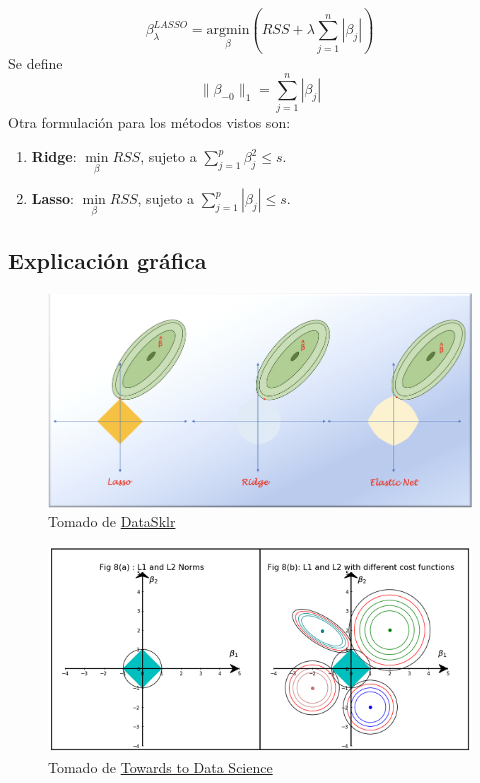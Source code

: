 \documentclass[
  12pt,
]{book}
\providecommand{\tightlist}{%
  \setlength{\itemsep}{0pt}\setlength{\parskip}{0pt}}
\theoremstyle{definition}
\theoremstyle{definition}
\theoremstyle{definition}
\theoremstyle{remark}
\begin{document}
\[ \beta_{\lambda}^{LASSO} = \underset{\beta}{\mathrm{argmin}}\left(RSS + \lambda\sum_{j=1}^n |\beta_j|\right)\]
Se define
\[ \|\beta_{-0}\|_1 = \sum_{j=1}^n|\beta_j|\]
Otra formulación para los métodos vistos son:

\begin{enumerate}
\def\labelenumi{\arabic{enumi}.}
\tightlist
\item
  \textbf{Ridge}: \(\underset{\beta}{\min} RSS\), sujeto a \(\displaystyle\sum_{j=1}^p\beta_j^2 \leq s\).
\item
  \textbf{Lasso}: \(\underset{\beta}{\min} RSS\), sujeto a \(\displaystyle\sum_{j=1}^p|\beta_j| \leq s\).
\end{enumerate}

\hypertarget{explicaciuxf3n-gruxe1fica}{%
\subsection{Explicación gráfica}\label{explicaciuxf3n-gruxe1fica}}

\begin{figure}
\centering
\includegraphics{manual_figures/ridge-lasso.png}
\caption{Tomado de \href{https://www.datasklr.com/extensions-of-ols-regression/regularization-and-shrinkage-ridge-lasso-and-elastic-net-regression}{DataSklr}}
\end{figure}

\begin{figure}
\centering
\includegraphics{manual_figures/ridge-lasso2.png}
\caption{Tomado de \href{https://towardsdatascience.com/regularization-in-machine-learning-connecting-the-dots-c6e030bfaddd}{Towards to Data Science}}
\end{figure}
\end{document}
